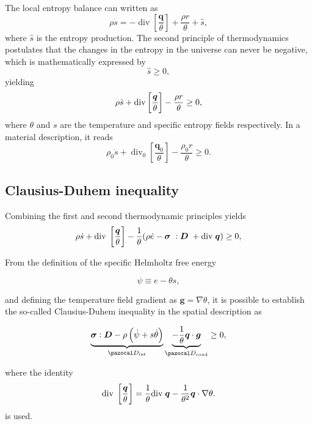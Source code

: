 The local entropy balance can written as
\begin{equation}
  \rho \dot s = -\operatorname{div}\left[\frac{\bm q}{\theta}\right] + \frac{\rho r}{\theta} + \hat{s},
\end{equation}
where \(\hat{s}\) is the entropy production.
The second principle of thermodynamics postulates that the changes in the entropy in the universe can never be negative, which is mathematically expressed by
\begin{equation}
  \hat s \geq 0,
\end{equation}
yielding
\begin{equation}
    \rho\dot s +\text{div}\left[\frac{\bm{q}}{\theta}\right] -\frac{\rho r}{\theta} \geq 0,
\end{equation}
   where $\theta$ and $s$ are the temperature and specific entropy fields respectively.
In a material description, it reads
\begin{equation}
  \rho_0 \dot s + \operatorname{div}_0 \left[\frac{\bm q_0}{\theta}\right] - \frac{\rho_0 r}{\theta} \geq 0.
\end{equation}

\subsection{Clausius-Duhem inequality}

Combining the first and second thermodynamic principles yields
\begin{equation}
    \rho\dot s + \text{div}\;\left[\frac{\bm{q}}{\theta}\right] -\frac{1}{\theta}(\rho\dot e -\bm{\sigma}\;:\bm D\; +\text{div}\;\bm{q})\geq 0,
\end{equation}

From the definition of the specific Helmholtz free energy
\begin{highlight}
\begin{equation} \label{eq:def_helmholtz_free_energy}
    \psi \equiv e -\theta s,
\end{equation}
\end{highlight}
and defining the temperature field gradient as $\bm g=\nabla \theta$, it is possible to establish the so-called Clausius-Duhem inequality in the spatial description as
\begin{highlight}
    \begin{equation}
        \underbrace{\mat \sigma:\mat D - \rho\left(\dot \psi +s\dot \theta\right)}_{\pazocal D_\text{int}} \underbrace{-\frac{1}{\theta}\vect q\cdot \vect g }_{\pazocal D_\text{cond}}\geq 0, \label{eq:clasius_duhem_eq}
    \end{equation}
\end{highlight}
where the identity
\begin{equation}
    \text{div}\;\left[\frac{\bm{q}}{\theta}\right] =\frac{1}{\theta}\text{div}\;\bm{q} -\frac{1}{\theta^2}\bm{q}\cdot \nabla \theta.
\end{equation}
is used.

